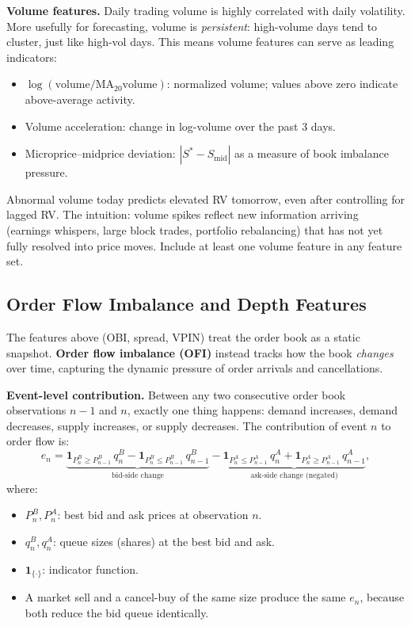 \textbf{Volume features.}
Daily trading volume is highly correlated with daily volatility.
More usefully for forecasting, volume is \emph{persistent}: high-volume days tend to cluster, just like high-vol days.
This means volume features can serve as leading indicators:
\begin{itemize}[nosep]
  \item $\log(\text{volume}/\text{MA}_{20}\text{volume})$: normalized volume; values above zero indicate above-average activity.
  \item Volume acceleration: change in log-volume over the past 3 days.
  \item Microprice--midprice deviation: $|S^* - S_{\text{mid}}|$ as a measure of book imbalance pressure.
\end{itemize}

\begin{keyidea}
Abnormal volume today predicts elevated RV tomorrow, even after controlling for lagged RV.
The intuition: volume spikes reflect new information arriving (earnings whispers, large block trades, portfolio rebalancing) that has not yet fully resolved into price moves.
Include at least one volume feature in any feature set.
\end{keyidea}

\subsection{Order Flow Imbalance and Depth Features}\label{sec:feat-ofi}

The features above (OBI, spread, VPIN) treat the order book as a static snapshot.
\textbf{Order flow imbalance (OFI)} \citep{ContKukanovStoikov2014} instead tracks how the book \emph{changes} over time, capturing the dynamic pressure of order arrivals and cancellations.

\textbf{Event-level contribution.}
Between any two consecutive order book observations $n-1$ and $n$, exactly one thing happens: demand increases, demand decreases, supply increases, or supply decreases.
The contribution of event $n$ to order flow is:
\begin{equation}\label{eq:ofi-event}
e_n = \underbrace{\mathbf{1}_{P_n^B \geq P_{n-1}^B}\,q_n^B - \mathbf{1}_{P_n^B \leq P_{n-1}^B}\,q_{n-1}^B}_{\text{bid-side change}}
    - \underbrace{\mathbf{1}_{P_n^A \leq P_{n-1}^A}\,q_n^A + \mathbf{1}_{P_n^A \geq P_{n-1}^A}\,q_{n-1}^A}_{\text{ask-side change \ (negated)}},
\end{equation}
where:
\begin{itemize}[nosep]
  \item $P_n^B, P_n^A$: best bid and ask prices at observation $n$.
  \item $q_n^B, q_n^A$: queue sizes (shares) at the best bid and ask.
  \item $\mathbf{1}_{\{\cdot\}}$: indicator function.
  \item A market sell and a cancel-buy of the same size produce the same $e_n$, because both reduce the bid queue identically.
\end{itemize}

